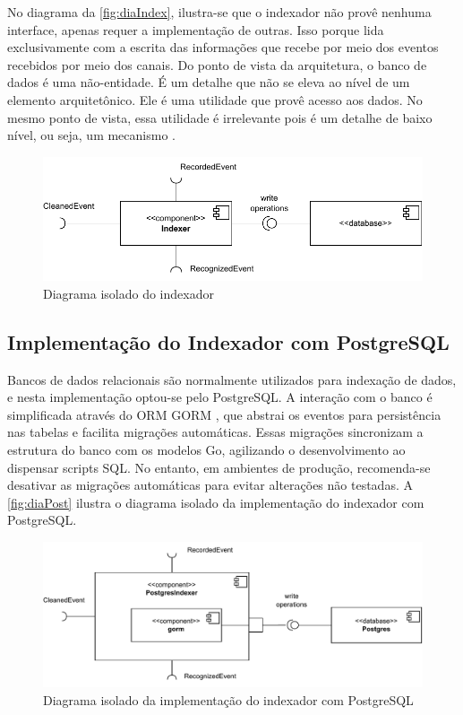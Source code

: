 \documentclass[12pt, %
openright, 
oneside, %
a4paper,    %
brazil]{facom-ufu-abntex2}
\begin{document}
No diagrama da \autoref{fig:diaIndex}, ilustra-se que o indexador não provê
nenhuma interface, apenas requer a implementação de outras. Isso porque lida
exclusivamente com a escrita das informações que recebe por meio dos eventos
recebidos por meio dos canais.
Do ponto de vista da arquitetura, o banco de dados é uma não-entidade. É um
detalhe que não se eleva ao nível de um elemento arquitetônico. Ele é uma
utilidade que provê acesso aos dados. No mesmo ponto de vista, essa utilidade é
irrelevante pois é um detalhe de baixo nível, ou seja, um mecanismo
\cite{martin2018clean}. %

\begin{figure}[!ht]
	\centering
	\includegraphics[width=0.8\linewidth]{indexer.pdf}
	\caption[Diagrama isolado do indexador]{Diagrama isolado do indexador}
	\label{fig:diaIndex}
\end{figure}

\subsection{Implementação do Indexador com PostgreSQL}

Bancos de dados relacionais são normalmente utilizados para indexação de dados,
e nesta implementação optou-se pelo PostgreSQL. A interação com o banco é
simplificada através do ORM GORM \cite{gorm}, que abstrai os eventos para
persistência nas tabelas e facilita migrações automáticas. Essas migrações
sincronizam a estrutura do banco com os modelos Go, agilizando o
desenvolvimento ao dispensar scripts SQL. No entanto, em ambientes de produção,
recomenda-se desativar as migrações automáticas para evitar alterações não
testadas. A \autoref{fig:diaPost} ilustra o diagrama isolado da implementação
do indexador com PostgreSQL.

\begin{figure}[!ht]
	\centering
	\includegraphics[width=1\linewidth]{postgres_indexer.pdf}
	\caption[Diagrama isolado da implementação do indexador com
		PostgreSQL]{Diagrama isolado da implementação do indexador com PostgreSQL}
	\label{fig:diaPost}
\end{figure}
\end{document}
